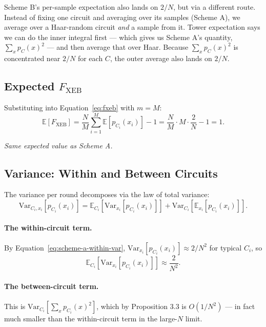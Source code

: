 \documentclass[11pt]{article}
\theoremstyle{plain}
\theoremstyle{definition}
\newcommand{\Fxeb}{F_{\text{XEB}}}
\newcommand{\E}{\mathbb{E}}
\newcommand{\Var}{\mathrm{Var}}
\begin{document}
\begin{intuition}
Scheme B's per-sample expectation also lands on $2/N$, but via a different route. Instead of fixing one circuit and averaging over its samples (Scheme A), we average over a Haar-random circuit \emph{and} a sample from it. Tower expectation says we can do the inner integral first --- which gives us Scheme A's quantity, $\sum_x p_C(x)^2$ --- and then average that over Haar. Because $\sum_x p_C(x)^2$ is concentrated near $2/N$ for each $C$, the outer average also lands on $2/N$.
\end{intuition}

\subsection{Expected $\Fxeb$}

Substituting into Equation~\eqref{eq:fxeb} with $m = M$:
\begin{equation}
\E[\Fxeb] = \frac{N}{M} \sum_{i=1}^{M} \E[p_{C_i}(x_i)] - 1 = \frac{N}{M} \cdot M \cdot \frac{2}{N} - 1 = 1.
\label{eq:scheme-b-expectation}
\end{equation}

\emph{Same expected value as Scheme A.}

\subsection{Variance: Within and Between Circuits}

The variance per round decomposes via the law of total variance:
\begin{equation}
\Var_{C_i, x_i}[p_{C_i}(x_i)] = \E_{C_i}\!\left[\Var_{x_i}[p_{C_i}(x_i)]\right] + \Var_{C_i}\!\left[\E_{x_i}[p_{C_i}(x_i)]\right].
\label{eq:total-var}
\end{equation}

\paragraph{The within-circuit term.} By Equation~\eqref{eq:scheme-a-within-var}, $\Var_{x_i}[p_{C_i}(x_i)] \approx 2/N^2$ for typical $C_i$, so
\[
\E_{C_i}\!\left[\Var_{x_i}[p_{C_i}(x_i)]\right] \approx \frac{2}{N^2}.
\]

\paragraph{The between-circuit term.} This is $\Var_{C_i}[\sum_x p_{C_i}(x)^2]$, which by Proposition 3.3 is $O(1/N^2)$ --- in fact much smaller than the within-circuit term in the large-$N$ limit.
\end{document}

